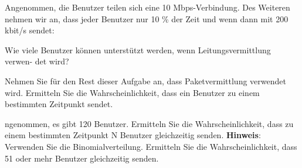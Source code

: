 \Aufgabenstellung%
Angenommen, die Benutzer teilen sich eine 10 Mbps-Verbindung. Des Weiteren nehmen
wir an, dass jeder Benutzer nur 10 \% der Zeit und wenn dann mit 200 kbit/s sendet:


\Teilaufgabe%
Wie viele Benutzer können unterstützt werden, wenn Leitungsvermittlung verwen-
det wird?


\Teilaufgabe%
Nehmen Sie für den Rest dieser Aufgabe an, dass Paketvermittlung verwendet
wird. Ermitteln Sie die Wahrscheinlichkeit, dass ein Benutzer zu einem bestimmten
Zeitpunkt sendet.


\Teilaufgabe%
ngenommen, es gibt 120 Benutzer. Ermitteln Sie die Wahrscheinlichkeit, dass zu
einem bestimmten Zeitpunkt N Benutzer gleichzeitig senden.
\textbf{Hinweis}: Verwenden Sie die Binomialverteilung.
\Teilaufgabe%
Ermitteln Sie die Wahrscheinlichkeit, dass 51 oder mehr Benutzer gleichzeitig
senden.


